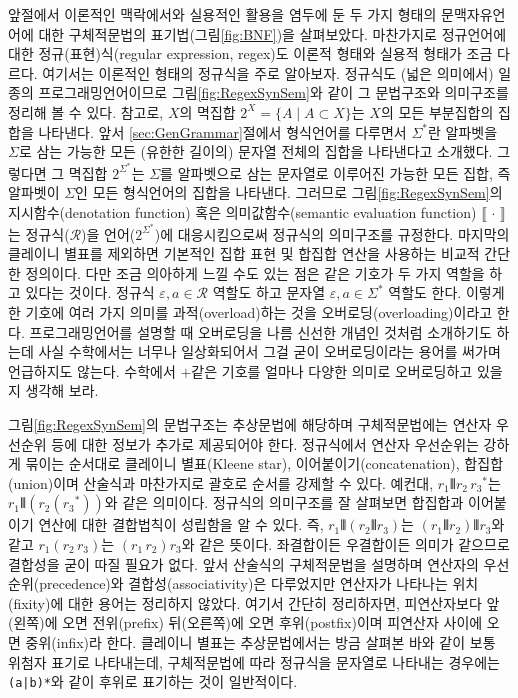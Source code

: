 앞절에서 이론적인 맥락에서와 실용적인 활용을 염두에 둔 두 가지 형태의
문맥자유언어에 대한 구체적문법의 표기법(그림\;\ref{fig:BNF})을 살펴보았다.
마찬가지로 정규언어에 대한 정규(표현)식(regular expression, regex)도
이론적 형태와 실용적 형태가 조금 다르다. 여기서는 이론적인 형태의
정규식을 주로 알아보자. 정규식도 (넓은 의미에서) 일종의 프로그래밍언어이므로
그림\;\ref{fig:RegexSynSem}와 같이 그 문법구조와 의미구조를 정리해 볼 수 있다.
참고로, $X$의 멱집합 $2^X = \{A\mid A\subset X\}$는 $X$의 모든 부분집합의
집합을 나타낸다. 앞서 \ref{sec:GenGrammar}절에서 형식언어를 다루면서
$\Sigma^{*}$란 알파벳을 $\Sigma$로 삼는 가능한 모든 (유한한 길이의)
문자열 전체의 집합을 나타낸다고 소개했다. 그렇다면 그 멱집합
$2^{\Sigma^{*}}$는 $\Sigma$를 알파벳으로 삼는 문자열로 이루어진
가능한 모든 집합, 즉 알파벳이 $\Sigma$인 모든 형식언어의 집합을 나타낸다.
그러므로 그림\;\ref{fig:RegexSynSem}의 지시함수(denotation function) 혹은
의미값함수(semantic evaluation function) $\llbracket\,\cdot\,\rrbracket$는
정규식($\mathcal{R}$)을 언어($2^{\Sigma^{*}}$)에 대응시킴으로써 정규식의
의미구조를 규정한다. 마지막의 클레이니 별표를 제외하면 기본적인 집합 표현
및 합집합 연산을 사용하는 비교적 간단한 정의이다. 다만 조금 의아하게 느낄
수도 있는 점은 같은 기호가 두 가지 역할을 하고 있다는 것이다.
정규식 $\varepsilon,a\in\mathcal{R}$ 역할도 하고
문자열 $\varepsilon,a\in\Sigma^{*}$ 역할도 한다.
이렇게 한 기호에 여러 가지 의미를 과적(overload)하는 것을
오버로딩(overloading)이라고 한다. 프로그래밍언어를 설명할
때 오버로딩을 나름 신선한 개념인 것처럼 소개하기도 하는데
사실 수학에서는 너무나 일상화되어서 그걸 굳이 오버로딩이라는
용어를 써가며 언급하지도 않는다. 수학에서 $+$같은 기호를 얼마나
다양한 의미로 오버로딩하고 있을지 생각해 보라.

그림\;\ref{fig:RegexSynSem}의 문법구조는 추상문법에 해당하며
구체적문법에는 연산자 우선순위 등에 대한 정보가 추가로 제공되어야 한다.
정규식에서 연산자 우선순위는 강하게 묶이는 순서대로
클레이니 별표(Kleene star), 이어붙이기(concatenation), 합집합(union)이며
산술식과 마찬가지로 괄호로 순서를 강제할 수 있다. 예컨대,
$r_1\VERT r_2\,{r_3}^{*}$는 $r_1\VERT(r_2({r_3}^{*}))$와 같은 의미이다.
정규식의 의미구조를 잘 살펴보면 합집합과 이어붙이기 연산에 대한
결합법칙이 성립함을 알 수 있다.
즉, $r_1\VERT(r_2\VERT r_3)$는 $(r_1\VERT r_2)\VERT r_3$와
같고 $r_1(r_2\,r_3)$는 $(r_1\,r_2)r_3$와 같은 뜻이다.
좌결합이든 우결합이든 의미가 같으므로 결합성을 굳이 따질 필요가 없다.
앞서 산술식의 구체적문법을 설명하며 연산자의 우선순위(precedence)와
결합성(associativity)은 다루었지만 연산자가 나타나는 위치(fixity)에
대한 용어는 정리하지 않았다. 여기서 간단히 정리하자면, 피연산자보다
앞(왼쪽)에 오면 전위(prefix) 뒤(오른쪽)에 오면 후위(postfix)이며
피연산자 사이에 오면 중위(infix)라 한다. 클레이니 별표는 추상문법에서는
방금 살펴본 바와 같이 보통 위첨자 표기로 나타내는데, 구체적문법에 따라
정규식을 문자열로 나타내는 경우에는 \verb/(a|b)*/와 같이 후위로
표기하는 것이 일반적이다.

